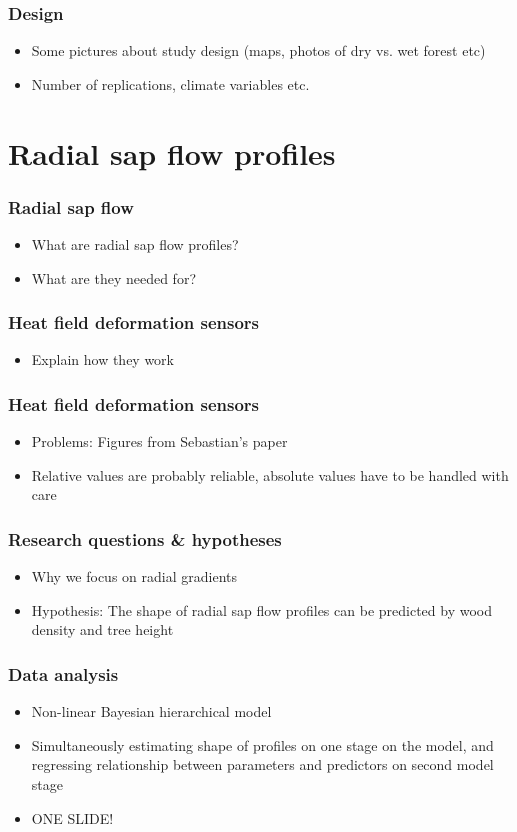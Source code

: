 \documentclass[usepdftitle=false]{beamer}
\begin{document}
\begin{frame}
	\frametitle{Design}
	\begin{itemize}
		\item Some pictures about study design (maps, photos of dry vs. wet forest etc)
		\item Number of replications, climate variables etc.
	\end{itemize}
\end{frame}


\section{Radial sap flow profiles}
\begin{frame}
	\frametitle{Radial sap flow}
	\begin{itemize}
		\item What are radial sap flow profiles?
		\item What are they needed for?
	\end{itemize}
\end{frame}

\begin{frame}
	\frametitle{Heat field deformation sensors}
	\begin{itemize}
		\item Explain how they work
	\end{itemize}
\end{frame}

\begin{frame}
	\frametitle{Heat field deformation sensors}
	\begin{itemize}
		\item Problems: Figures from Sebastian's paper
		\item Relative values are probably reliable, absolute values have to be handled with care
	\end{itemize}
\end{frame}

\begin{frame}
	\frametitle{Research questions \& hypotheses}
	\begin{itemize}
		\item Why we focus on radial gradients
		\item Hypothesis: The shape of radial sap flow profiles can be predicted by wood density and tree height 
	\end{itemize}
\end{frame}

\begin{frame}
	\frametitle{Data analysis}
	\begin{itemize}
		\item Non-linear Bayesian hierarchical model
		\item Simultaneously estimating shape of profiles on one stage on the model, and regressing relationship between parameters and predictors on second model stage
		\item ONE SLIDE!
	\end{itemize}
\end{frame}
\end{document}
